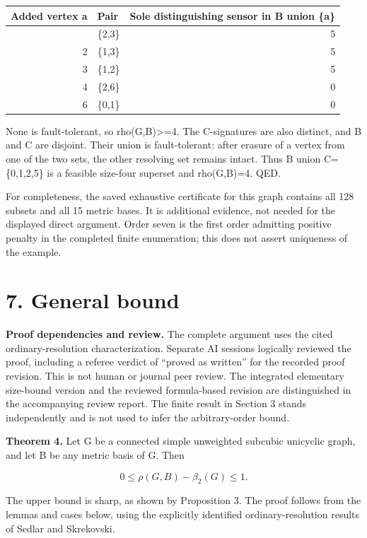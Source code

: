 \documentclass[
]{article}
\newcounter{none} %
\begin{document}
{\def\LTcaptype{none} %
\begin{longtable}[]{@{}rlr@{}}
\toprule\noalign{}
Added vertex a & Pair & Sole distinguishing sensor in B union \{a\} \\
\midrule\noalign{}
\endhead
\bottomrule\noalign{}
\endlastfoot
1 & \{2,3\} & 5 \\
2 & \{1,3\} & 5 \\
3 & \{1,2\} & 5 \\
4 & \{2,6\} & 0 \\
6 & \{0,1\} & 0 \\
\end{longtable}
}

None is fault-tolerant, so rho(G,B)\textgreater=4. The C-signatures are
also distinct, and B and C are disjoint. Their union is fault-tolerant:
after erasure of a vertex from one of the two sets, the other resolving
set remains intact. Thus B union C=\{0,1,2,5\} is a feasible size-four
superset and rho(G,B)=4. QED.

For completeness, the saved exhaustive certificate for this graph
contains all 128 subsets and all 15 metric bases. It is additional
evidence, not needed for the displayed direct argument. Order seven is
the first order admitting positive penalty in the completed finite
enumeration; this does not assert uniqueness of the example.

\section{7. General bound}\label{general-bound}

\textbf{Proof dependencies and review.} The complete argument uses the
cited ordinary-resolution characterization. Separate AI sessions
logically reviewed the proof, including a referee verdict of ``proved as
written'' for the recorded proof revision. This is not human or journal
peer review. The integrated elementary size-bound version and the
reviewed formula-based revision are distinguished in the accompanying
review report. The finite result in Section 3 stands independently and
is not used to infer the arbitrary-order bound.

\textbf{Theorem 4.} Let G be a connected simple unweighted subcubic
unicyclic graph, and let B be any metric basis of G. Then

\[0\le \rho(G,B)-\beta_2(G)\le 1.\]

The upper bound is sharp, as shown by Proposition 3. The proof follows
from the lemmas and cases below, using the explicitly identified
ordinary-resolution results of Sedlar and Skrekovski.
\end{document}
